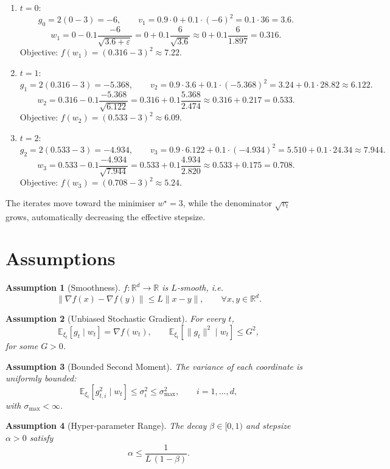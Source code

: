 \documentclass{article}
\newtheorem{assumption}{Assumption}
\newcommand{\E}{\mathbb{E}}
\newcommand{\R}{\mathbb{R}}
\begin{document}
\begin{enumerate}[label=Iteration \arabic*:, leftmargin=*, nosep]
\item $t=0$:
\[
g_0 = 2(0-3) = -6,\qquad
v_1 = 0.9\cdot 0 + 0.1\cdot (-6)^2 = 0.1\cdot 36 = 3.6.
\]
\[
w_1 = 0 - 0.1\frac{-6}{\sqrt{3.6+\varepsilon}}
      = 0 + 0.1\frac{6}{\sqrt{3.6}}
      \approx 0 + 0.1\frac{6}{1.897}=0.316.
\]
Objective: $f(w_1)=(0.316-3)^2\approx7.22$.

\item $t=1$:
\[
g_1 = 2(0.316-3) = -5.368,\qquad
v_2 = 0.9\cdot 3.6 + 0.1\cdot (-5.368)^2
     = 3.24 + 0.1\cdot 28.82 \approx 6.122.
\]
\[
w_2 = 0.316 - 0.1\frac{-5.368}{\sqrt{6.122}}
     = 0.316 + 0.1\frac{5.368}{2.474}
     \approx 0.316 + 0.217 = 0.533.
\]
Objective: $f(w_2)=(0.533-3)^2\approx6.09$.

\item $t=2$:
\[
g_2 = 2(0.533-3) = -4.934,\qquad
v_3 = 0.9\cdot 6.122 + 0.1\cdot (-4.934)^2
     = 5.510 + 0.1\cdot 24.34 \approx 7.944.
\]
\[
w_3 = 0.533 - 0.1\frac{-4.934}{\sqrt{7.944}}
     = 0.533 + 0.1\frac{4.934}{2.820}
     \approx 0.533 + 0.175 = 0.708.
\]
Objective: $f(w_3)=(0.708-3)^2\approx5.24$.
\end{enumerate}
The iterates move toward the minimiser $w^\star=3$, while the denominator
$\sqrt{v_t}$ grows, automatically decreasing the effective stepsize.

\newpage
\section*{Assumptions}
\begin{assumption}[Smoothness]\label{ass:smooth}
$f:\R^d\!\to\!\R$ is $L$‑smooth, i.e.
\[
\|\nabla f(x)-\nabla f(y)\|\le L\|x-y\|,\qquad\forall x,y\in\R^d.
\tag{A1}
\]
\end{assumption}
\begin{assumption}[Unbiased Stochastic Gradient]\label{ass:unbiased}
For every $t$, 
\[
\E_{\xi_t}[g_t\mid w_t]=\nabla f(w_t),\qquad 
\E_{\xi_t}[\|g_t\|^2\mid w_t]\le G^2,
\tag{A2}
\]
for some $G>0$.
\end{assumption}
\begin{assumption}[Bounded Second Moment]\label{ass:bound-second}
The variance of each coordinate is uniformly bounded:
\[
\E_{\xi_t}[g_{t,i}^2\mid w_t]\le \sigma_i^2\le \sigma_{\max}^2,\qquad
i=1,\dots,d,
\tag{A3}
\]
with $\sigma_{\max}<\infty$.
\end{assumption}
\begin{assumption}[Hyper‑parameter Range]\label{ass:hyper}
The decay $\beta\in[0,1)$ and stepsize $\alpha>0$ satisfy
\[
\alpha\le \frac{1}{L\,(1-\beta)}.
\tag{A4}
\]
\end{assumption}
\end{document}

